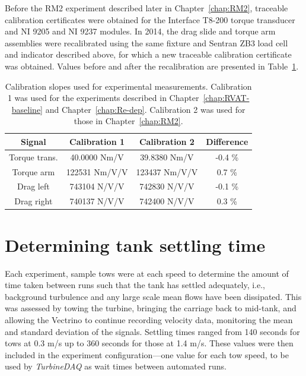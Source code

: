 Before the RM2 experiment described later in Chapter~\ref{chap:RM2}, traceable
calibration certificates were obtained for the Interface T8-200 torque
transducer and NI 9205 and NI 9237 modules. In 2014, the drag slide and torque
arm assemblies were recalibrated using the same fixture and Sentran ZB3 load
cell and indicator described above, for which a new traceable calibration
certificate was obtained. Values before and after the recalibration are
presented in Table~\ref{tab:calibrations}.

\begin{table}
    \centering
\begin{tabular}{c|c|c|c}
    Signal & Calibration 1 & Calibration 2 & Difference \\ 
    \hline 
    Torque trans. & 40.0000 Nm/V & 39.8380 Nm/V & -0.4 \% \\ 
    Torque arm & 122531 Nm/V/V & 123437 Nm/V/V & 0.7 \% \\ 
    Drag left & 743104 N/V/V & 742830 N/V/V & -0.1 \% \\ 
    Drag right & 740137 N/V/V & 742400 N/V/V & 0.3 \% \\ 
\end{tabular}
    \caption{Calibration slopes used for experimental measurements. Calibration
        1 was used for the experiments described in Chapter~\ref{chap:RVAT-baseline}
        and Chapter~\ref{chap:Re-dep}. Calibration 2 was used for those in
        Chapter~\ref{chap:RM2}.}
    
    \label{tab:calibrations}
\end{table}


\section{Determining tank settling time}

Each experiment, sample tows were at each speed to determine the amount of time
taken between runs such that the tank has settled adequately, i.e., background
turbulence and any large scale mean flows have been dissipated. This was
assessed by towing the turbine, bringing the carriage back to mid-tank, and
allowing the Vectrino to continue recording velocity data, monitoring the mean
and standard deviation of the signals. Settling times ranged from 140 seconds
for tows at 0.3 m/s up to 360 seconds for those at 1.4 m/s. These values were
then included in the experiment configuration---one value for each tow speed, to
be used by \textit{TurbineDAQ} as wait times between automated runs.


